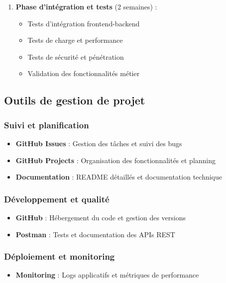 \documentclass[12pt,a4paper]{report}
\begin{document}
\begin{enumerate}
\item \textbf{Phase d'intégration et tests} (2 semaines) :
  \begin{itemize}
  \item Tests d'intégration frontend-backend
  \item Tests de charge et performance
  \item Tests de sécurité et pénétration
  \item Validation des fonctionnalités métier
  \end{itemize}
\end{enumerate}

\subsection{Outils de gestion de projet}

\subsubsection{Suivi et planification}
\begin{itemize}
\item \textbf{GitHub Issues} : Gestion des tâches et suivi des bugs
\item \textbf{GitHub Projects} : Organisation des fonctionnalités et planning
\item \textbf{Documentation} : README détaillés et documentation technique
\end{itemize}

\subsubsection{Développement et qualité}
\begin{itemize}
\item \textbf{GitHub} : Hébergement du code et gestion des versions
\item \textbf{Postman} : Tests et documentation des APIs REST
\end{itemize}

\subsubsection{Déploiement et monitoring}
\begin{itemize}
\item \textbf{Monitoring} : Logs applicatifs et métriques de performance
\end{itemize}
\end{document}
